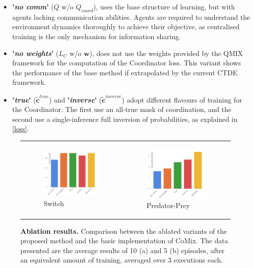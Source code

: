 \documentclass[a4paper,singleside,12pt]{report} %
\begin{document}
\begin{itemize}
  \item \textbf{'\textit{no comm}'} ($Q$ w/o $Q_{coord}$), uses the base structure of learning, but with agents lacking communication abilities. Agents are required to understand the environment dynamics thoroughly to achieve their objective, as centralised training is the only mechanism for information sharing.
  \item \textbf{'\textit{no weights}'} ($L_C$ w/o $\textbf{w}$), does not use the weights provided by the QMIX framework for the computation of the Coordinator loss. This variant shows the performance of the base method if extrapolated by the current CTDE framework.
  \item \textbf{'\textit{true}'} ($\tilde{\textbf{c}}^{true}$) and \textbf{'\textit{inverse}'} ($\tilde{\textbf{c}}^{inverse}$) adopt different flavours of training for the Coordinator. The first use an all-true mask of coordination, and the second use a single-inference full inversion of probabilities, as explained in \ref{loss}.
\end{itemize}

\begin{figure}
  \centering
  \begin{tabular}{p{4.5cm} p{4.5cm}}
  \begin{subfigure}[b]{5cm}
      \caption{Switch}
      \includegraphics[width=5cm]{images/ablation_switch.png}
  \end{subfigure} &
  \begin{subfigure}[b]{5cm}
      \caption{Predator-Prey}
      \includegraphics[width=5cm]{images/ablation_pursuit.png}
  \end{subfigure} \\
  \end{tabular}
  \caption{\textbf{Ablation results.} Comparison between the ablated variants of the proposed method and the basic implementation of CoMix. The data presented are the average results of 10 (a) and 5 (b) episodes, after an equivalent amount of training, averaged over 3 executions each.}
  \label{fig:ablation-res}
\end{figure}
\end{document}
